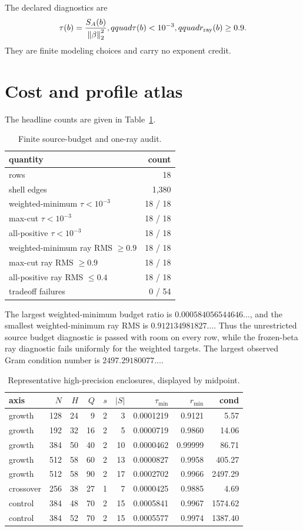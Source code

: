 \documentclass[10pt]{article}
\newcommand{\norm}[1]{\left\lVert #1\right\rVert}
\begin{document}
The declared diagnostics are
\[
 \tau(b)=\frac{S_A(b)}{\norm{\beta}_2^2},qquad
 \tau(b)<10^{-3},qquad r_{\rm ray}(b)\ge0.9.
 \label{eq:diagnostics}
\]
They are finite modeling choices and carry no exponent credit.

\section{Cost and profile atlas}

The headline counts are given in Table~\ref{tab:headline}.

\begin{table}[ht]
\centering
\small
\caption{Finite source-budget and one-ray audit.}
\label{tab:headline}
\begin{tabular}{@{}lr@{}}
\toprule
quantity & count\\
\midrule
rows & 18\\
shell edges & 1,380\\
weighted-minimum $\tau<10^{-3}$ & 18 / 18\\
max-cut $\tau<10^{-3}$ & 18 / 18\\
all-positive $\tau<10^{-3}$ & 18 / 18\\
weighted-minimum ray RMS $\ge0.9$ & 18 / 18\\
max-cut ray RMS $\ge0.9$ & 18 / 18\\
all-positive ray RMS $\le0.4$ & 18 / 18\\
tradeoff failures & 0 / 54\\
\bottomrule
\end{tabular}
\end{table}

The largest weighted-minimum budget ratio is
$0.000584056544646\ldots$, and the smallest weighted-minimum ray RMS is
$0.912134981827\ldots$.  Thus the unrestricted source budget diagnostic is
passed with room on every row, while the frozen-beta ray diagnostic fails
uniformly for the weighted targets.  The largest observed Gram condition
number is $2497.29180077\ldots$.

\begin{table}[ht]
\centering
\scriptsize
\caption{Representative high-precision enclosures, displayed by midpoint.}
\label{tab:rows}
\begin{tabular}{@{}lrrrrrrrr@{}}
\toprule
axis & $N$ & $H$ & $Q$ & $s$ & $|S|$ & $\tau_{\min}$ & $r_{\min}$ & cond\\
\midrule
growth &128&24&9 &2&3 &0.0001219&0.9121&5.57\\
growth &192&32&16&2&5 &0.0000719&0.9860&14.06\\
growth &384&50&40&2&10&0.0000462&0.99999&86.71\\
growth &512&58&60&2&13&0.0000827&0.9958&405.27\\
growth &512&58&90&2&17&0.0002702&0.9966&2497.29\\
crossover&256&38&27&1&7 &0.0000425&0.9885&4.69\\
control &384&48&70&2&15&0.0005841&0.9967&1574.62\\
control &384&52&70&2&15&0.0005577&0.9974&1387.40\\
\bottomrule
\end{tabular}
\end{table}
\end{document}

